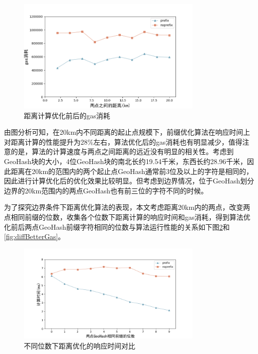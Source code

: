 \begin{figure}[h]
  \centering
  \includegraphics[height=0.3\textheight,width=0.8\textwidth]{figures/距离计算优化gas}
  \caption{距离计算优化前后的gas消耗}\label{fig:betterGas}
\end{figure}

由图分析可知，在20km内不同距离的起止点规模下，前缀优化算法在响应时间上对距离计算的性能提升为28$\%$左右，算法优化后的gas消耗也有明显减少，值得注意的是，算法的计算速度与两点之间距离的远近没有明显的相关性。考虑到GeoHash块的大小，4位GeoHash块的南北长约19.54千米，东西长约28.96千米，因此距离在20km的范围内的两个起止点GeoHash通常前3位及以上的字符是相同的，因此进行计算优化后的优化效果比较明显。但考虑到边界情况，位于GeoHash划分边界的20km范围内的两点GeoHash也有前三位的字符不同的时候。

为了探究边界条件下距离优化算法的表现，本文考虑距离20km内的两点，改变两点相同前缀的位数，收集各个位数下距离计算的响应时间和gas消耗，得到算法优化前后两点GeoHash前缀字符相同的位数与算法运行性能的关系如下图\ref{fig:diffBetterTime}和\ref{fig:diffBetterGas}。

\begin{figure}[h]
  \centering
  \includegraphics[height=0.3\textheight,width=0.8\textwidth]{figures/不同位数优化时间}
  \caption{不同位数下距离优化的响应时间对比}\label{fig:diffBetterTime}
\end{figure}

